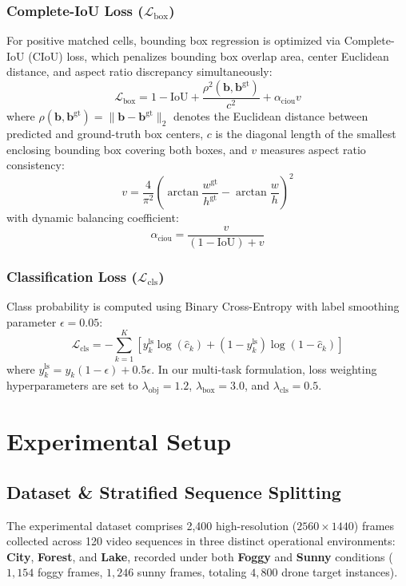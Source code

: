 \documentclass[10pt,conference,letterpaper,twocolumn]{article}
\begin{document}
\subsubsection{Complete-IoU Loss ($\mathcal{L}_{\text{box}}$)}
For positive matched cells, bounding box regression is optimized via Complete-IoU (CIoU) loss, which penalizes bounding box overlap area, center Euclidean distance, and aspect ratio discrepancy simultaneously:
\begin{equation}
\mathcal{L}_{\text{box}} = 1 - \text{IoU} + \frac{\rho^2(\mathbf{b}, \mathbf{b}^{\text{gt}})}{c^2} + \alpha_{\text{ciou}} v
\end{equation}
where $\rho(\mathbf{b}, \mathbf{b}^{\text{gt}}) = \|\mathbf{b} - \mathbf{b}^{\text{gt}}\|_2$ denotes the Euclidean distance between predicted and ground-truth box centers, $c$ is the diagonal length of the smallest enclosing bounding box covering both boxes, and $v$ measures aspect ratio consistency:
\begin{equation}
v = \frac{4}{\pi^2} \left( \arctan\frac{w^{\text{gt}}}{h^{\text{gt}}} - \arctan\frac{w}{h} \right)^2
\end{equation}
with dynamic balancing coefficient:
\begin{equation}
\alpha_{\text{ciou}} = \frac{v}{(1 - \text{IoU}) + v}
\end{equation}

\subsubsection{Classification Loss ($\mathcal{L}_{\text{cls}}$)}
Class probability is computed using Binary Cross-Entropy with label smoothing parameter $\epsilon=0.05$:
\begin{equation}
\mathcal{L}_{\text{cls}} = -\sum_{k=1}^K \left[ y_k^{\text{ls}} \log(\hat{c}_k) + (1 - y_k^{\text{ls}}) \log(1 - \hat{c}_k) \right]
\end{equation}
where $y_k^{\text{ls}} = y_k (1 - \epsilon) + 0.5 \epsilon$. In our multi-task formulation, loss weighting hyperparameters are set to $\lambda_{\text{obj}}=1.2$, $\lambda_{\text{box}}=3.0$, and $\lambda_{\text{cls}}=0.5$.

\section{Experimental Setup}

\subsection{Dataset \& Stratified Sequence Splitting}
The experimental dataset comprises 2,400 high-resolution ($2560\times 1440$) frames collected across 120 video sequences in three distinct operational environments: \textbf{City}, \textbf{Forest}, and \textbf{Lake}, recorded under both \textbf{Foggy} and \textbf{Sunny} conditions ($1,154$ foggy frames, $1,246$ sunny frames, totaling $4,800$ drone target instances).
\end{document}
